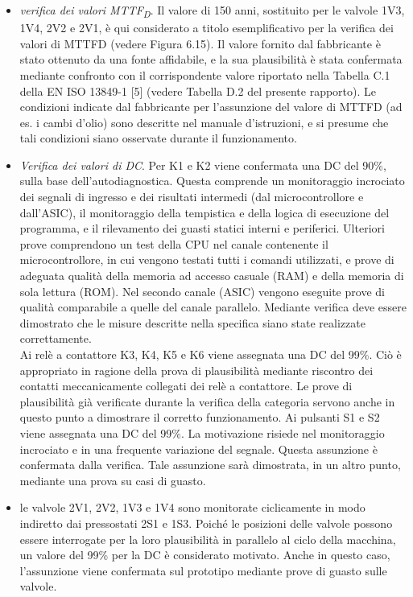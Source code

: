 \begin{itemize}
    \item \textit{verifica dei valori MTTF\textsubscript{D}}. Il valore di 150 anni, sostituito per le valvole 1V3, 1V4, 2V2 e 2V1, è qui considerato a titolo esemplificativo per la verifica dei valori di MTTFD (vedere Figura 6.15). Il valore fornito dal fabbricante è stato ottenuto da una fonte affidabile, e la sua plausibilità è stata confermata mediante confronto con il corrispondente valore riportato nella Tabella C.1 della EN ISO 13849-1 [5] (vedere Tabella D.2 del presente rapporto). Le condizioni indicate dal fabbricante per l'assunzione del valore di MTTFD (ad es. i cambi d'olio) sono descritte nel manuale d'istruzioni, e si presume che tali condizioni siano osservate durante il funzionamento.
    \item \textit{Verifica dei valori di DC}. Per K1 e K2 viene confermata una DC del 90\%, sulla base dell'autodiagnostica. Questa comprende un monitoraggio incrociato dei segnali di ingresso e dei risultati intermedi (dal microcontrollore e dall'ASIC), il monitoraggio della tempistica e della logica di esecuzione del programma, e il rilevamento dei guasti statici interni e periferici. Ulteriori prove comprendono un test della CPU nel canale contenente il microcontrollore, in cui vengono testati tutti i comandi utilizzati, e prove di adeguata qualità della memoria ad accesso casuale (RAM) e della memoria di sola lettura (ROM). Nel secondo canale (ASIC) vengono eseguite prove di qualità comparabile a quelle del canale parallelo. Mediante verifica deve essere dimostrato che le misure descritte nella specifica siano state realizzate correttamente.\\
    Ai relè a contattore K3, K4, K5 e K6 viene assegnata una DC del 99\%. Ciò è appropriato in ragione della prova di plausibilità mediante riscontro dei contatti meccanicamente collegati dei relè a contattore. Le prove di plausibilità già verificate durante la verifica della categoria servono anche in questo punto a dimostrare il corretto funzionamento.
    Ai pulsanti S1 e S2 viene assegnata una DC del 99\%. La motivazione risiede nel monitoraggio incrociato e in una frequente variazione del segnale. Questa assunzione è confermata dalla verifica. Tale assunzione sarà dimostrata, in un altro punto, mediante una prova su casi di guasto.
    \item le valvole 2V1, 2V2, 1V3 e 1V4 sono monitorate ciclicamente in modo indiretto dai pressostati 2S1 e 1S3. Poiché le posizioni delle valvole possono essere interrogate per la loro plausibilità in parallelo al ciclo della macchina, un valore del 99\% per la DC è considerato motivato. Anche in questo caso, l'assunzione viene confermata sul prototipo mediante prove di guasto sulle valvole.

\end{itemize}

